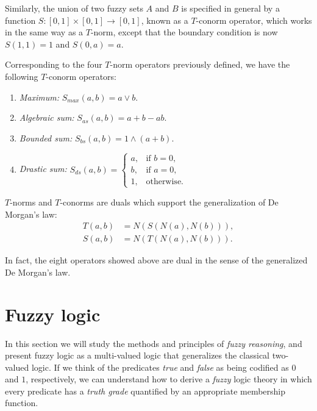 \begin{definition} Similarly, the union of two fuzzy sets $A$ and $B$ is specified in general by a function $S:[0,1]\times [0,1] \to [0,1]$, known as a $T$-conorm operator, which works in the same way as a $T$-norm, except that the boundary condition is now $S(1,1) = 1$ and $S(0,a) = a$.

\end{definition}

Corresponding to the four $T$-norm operators previously defined, we have the following $T$-conorm operators:

\begin{enumerate}
	\item \textit{Maximum:} $S_{max}(a,b) = a \lor b$.
	\item \textit{Algebraic sum:} $S_{as}(a,b)=a + b - ab$.
	\item \textit{Bounded sum:} $S_{bs}(a,b) = 1 \land (a+b)$.
	\item \textit{Drastic sum:} $S_{ds}(a,b) = \begin{cases}
	                                      a, & \text{if } b = 0,\\
	                                      b, & \text{if } a = 0,\\
	                                      1, & \text{otherwise}.
                                          \end{cases}$
\end{enumerate}

\begin{theorem} $T$-norms and $T$-conorms are duals which support the generalization of De Morgan's law:
\begin{align*}
	T(a,b) &= N(S(N(a),N(b))),\\
	S(a,b) &= N(T(N(a), N(b))).
\end{align*}

\end{theorem}

In fact, the eight operators showed above are dual in the sense of the generalized De Morgan's law.

\section{Fuzzy logic}

In this section we will study the methods and principles of \textit{fuzzy reasoning}, and present fuzzy logic as a multi-valued logic that generalizes the classical two-valued logic. If we think of the predicates \textit{true} and \textit{false} as being codified as $0$ and $1$, respectively, we can understand how to derive a \textit{fuzzy} logic theory in which every predicate has a \textit{truth grade} quantified by an appropriate membership function.

